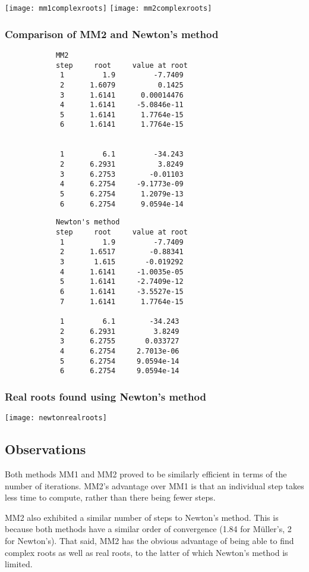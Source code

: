 \documentclass{article}
\begin{document}
	\texttt{[image: mm1complexroots]}
	\texttt{[image: mm2complexroots]}
	
	\newpage
	\subsubsection{Comparison of MM2 and Newton's method}
	
		\begin{multicols}{2}
		\begin{verbatim}
			MM2
			step     root     value at root
			 1         1.9         -7.7409 
			 2      1.6079          0.1425 
			 3      1.6141      0.00014476 
			 4      1.6141     -5.0846e-11 
			 5      1.6141      1.7764e-15 
			 6      1.6141      1.7764e-15 
			 

			 1         6.1         -34.243 
			 2      6.2931          3.8249 
			 3      6.2753        -0.01103 
			 4      6.2754     -9.1773e-09 
			 5      6.2754      1.2079e-13 
			 6      6.2754      9.0594e-14 
		\end{verbatim}
		\begin{verbatim}
			Newton's method
			step     root     value at root
			 1         1.9         -7.7409 
			 2      1.6517        -0.88341 
			 3       1.615       -0.019292 
			 4      1.6141     -1.0035e-05 
			 5      1.6141     -2.7409e-12 
			 6      1.6141     -3.5527e-15 
			 7      1.6141      1.7764e-15 
			 
			 1         6.1        -34.243  
			 2      6.2931         3.8249  
			 3      6.2755       0.033727  
			 4      6.2754     2.7013e-06  
			 5      6.2754     9.0594e-14  
			 6      6.2754     9.0594e-14  
		\end{verbatim}
	\end{multicols}
	
	\subsubsection{Real roots found using Newton's method}
	
	\texttt{[image: newtonrealroots]}
	
	\subsection{Observations}
	
	Both methods MM1 and MM2 proved to be similarly efficient in terms of the
	number of iterations. MM2's advantage over MM1 is that an individual step
	takes less time to compute, rather than there being fewer steps.
	
	MM2 also exhibited a similar number of steps to Newton's method. This is
	because both methods have a similar order of convergence (1.84 for
	M{\"u}ller's, 2 for Newton's). That said, MM2 has the obvious advantage of
	being able to find complex roots as well as real roots, to the latter of
	which Newton's method is limited.
	
\end{document}
